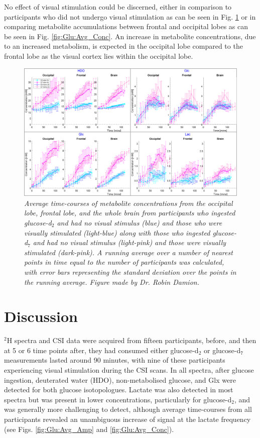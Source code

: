 No effect of visual stimulation could be discerned, either in comparison to participants who did not undergo visual stimulation as can be seen in Fig. \ref{fig:Glu:Vis_Stim} or in comparing metabolite accumulations between frontal and occipital lobes as can be seen in Fig. \ref{fig:Glu:Avg_Conc}. An increase in metabolite concentrations, due to an increased metabolism, is expected in the occipital lobe compared to the frontal lobe as the visual cortex lies within the occipital lobe.

\begin{figure}
    \centering
    \includegraphics[width = 1\textwidth]{Figures/Glucose/Vis_Stim.png}
    \caption{\textit{Average time-courses of metabolite concentrations from the occipital lobe, frontal lobe, and the whole brain from participants who ingested glucose-d$_2$ and had no visual stimulus (blue) and those who were visually stimulated (light-blue) along with those who ingested glucose-d$_7$ and had no visual stimulus (light-pink) and those were visually stimulated (dark-pink). A running average over a number of nearest points in time equal to the number of participants was calculated, with error bars representing the standard deviation over the points in the running average. Figure made by Dr. Robin Damion.}}
    \label{fig:Glu:Vis_Stim}
\end{figure}

\section{Discussion}

$^2$H spectra and \ac{CSI} data were acquired from fifteen participants, before, and then at 5 or 6 time points after, they had consumed either glucose-d$_2$ or glucose-d$_7$ measurements lasted around 90 minutes, with nine of these participants experiencing visual stimulation during the \ac{CSI} scans. In all spectra, after glucose ingestion, deuterated water (\ac{HDO}), non-metabolised glucose, and Glx were detected for both glucose isotopologues. Lactate was also detected in most spectra but was present in lower concentrations, particularly for glucose-d$_2$, and was generally more challenging to detect, although average time-courses from all participants revealed an unambiguous increase of signal at the lactate frequency (see Figs. \ref{fig:Glu:Avg_Amp} and \ref{fig:Glu:Avg_Conc}). 

